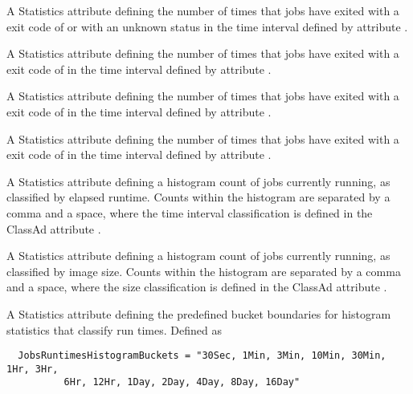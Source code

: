 \begin{description}
\item[\AdAttr{JobsExitException}:]  A Statistics attribute defining
  the number of times that jobs 
  have exited with a  exit code of 
  or with an unknown status
  in the time interval defined by attribute .

\item[\AdAttr{JobsKilled}:]  A Statistics attribute defining
  the number of times that jobs 
  have exited with a  exit code of 
  in the time interval defined by attribute .

\item[\AdAttr{JobsMissedDeferralTime}:]  A Statistics attribute defining
  the number of times that jobs
  have exited with a  exit code of 
  in the time interval defined by attribute .

\item[\AdAttr{JobsNotStarted}:]  A Statistics attribute defining
  the number of times that jobs 
  have exited with a  exit code of 
  in the time interval defined by attribute .

\item[\AdAttr{JobsRunningRuntimes}:] A Statistics attribute defining
  a histogram count of jobs currently running,
  as classified by elapsed runtime.
  Counts within the histogram are separated by a comma and a space, 
  where the time interval classification is defined in the ClassAd attribute
  .

\item[\AdAttr{JobsRunningSizes}:] A Statistics attribute defining
  a histogram count of jobs currently running,
  as classified by image size.
  Counts within the histogram are separated by a comma and a space, 
  where the size classification is defined in the ClassAd attribute
  .

\item[\AdAttr{JobsRuntimesHistogramBuckets}:] A Statistics attribute defining
  the predefined bucket boundaries for histogram statistics that
  classify run times.
  Defined as
\footnotesize
\begin{verbatim}
  JobsRuntimesHistogramBuckets = "30Sec, 1Min, 3Min, 10Min, 30Min, 1Hr, 3Hr, 
          6Hr, 12Hr, 1Day, 2Day, 4Day, 8Day, 16Day"
\end{verbatim}
\normalsize


\end{description}

